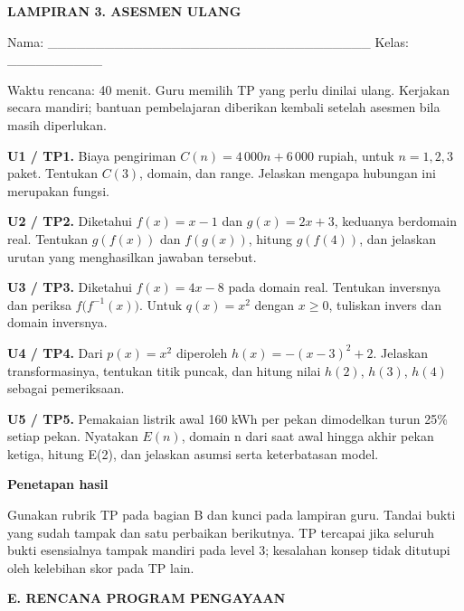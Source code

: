 \documentclass[11pt,a4paper]{article}
\begin{document}
\clearpage
\begin{center}\bfseries\large LAMPIRAN 3. ASESMEN ULANG\end{center}\medskip
{\small Nama: \_\_\_\_\_\_\_\_\_\_\_\_\_\_\_\_\_\_\_\_\_\_\_\_\_\_\_\_\_\_\_\_\_\_  Kelas: \_\_\_\_\_\_\_\_\_\_\par}\medskip
{\small Waktu rencana: 40 menit. Guru memilih TP yang perlu dinilai ulang. Kerjakan secara mandiri; bantuan pembelajaran diberikan kembali setelah asesmen bila masih diperlukan.\par}\medskip
\noindent\textbf{U1 / TP1.} Biaya pengiriman \(C(n) = 4\,000n + 6\,000\) rupiah, untuk \(n = 1, 2, 3\) paket. Tentukan \(C(3)\), domain, dan range. Jelaskan mengapa hubungan ini merupakan fungsi.\par\vspace{8mm}
\noindent\textbf{U2 / TP2.} Diketahui \(f(x) = x - 1\) dan \(g(x) = 2x + 3\), keduanya berdomain real. Tentukan \(g(f(x))\) dan \(f(g(x))\), hitung \(g(f(4))\), dan jelaskan urutan yang menghasilkan jawaban tersebut.\par\vspace{8mm}
\noindent\textbf{U3 / TP3.} Diketahui \(f(x) = 4x - 8\) pada domain real. Tentukan inversnya dan periksa \(f\bigl(f^{-1}(x)\bigr)\). Untuk \(q(x) = x^2\) dengan \(x \geq  0\), tuliskan invers dan domain inversnya.\par\vspace{8mm}
\noindent\textbf{U4 / TP4.} Dari \(p(x) = x^2\) diperoleh \(h(x) = -(x - 3)^2 + 2\). Jelaskan transformasinya, tentukan titik puncak, dan hitung nilai \(h(2)\), \(h(3)\), \(h(4)\) sebagai pemeriksaan.\par\vspace{8mm}
\noindent\textbf{U5 / TP5.} Pemakaian listrik awal 160 kWh per pekan dimodelkan turun 25\% setiap pekan. Nyatakan \(E(n)\), domain n dari saat awal hingga akhir pekan ketiga, hitung E(2), dan jelaskan asumsi serta keterbatasan model.\par\vspace{8mm}
\par\medskip\noindent\textbf{Penetapan hasil}\par\smallskip
{\small Gunakan rubrik TP pada bagian B dan kunci pada lampiran guru. Tandai bukti yang sudah tampak dan satu perbaikan berikutnya. TP tercapai jika seluruh bukti esensialnya tampak mandiri pada level 3; kesalahan konsep tidak ditutupi oleh kelebihan skor pada TP lain.\par}\medskip
\clearpage
\begin{center}\bfseries\large E. RENCANA PROGRAM PENGAYAAN\end{center}\medskip
\end{document}

